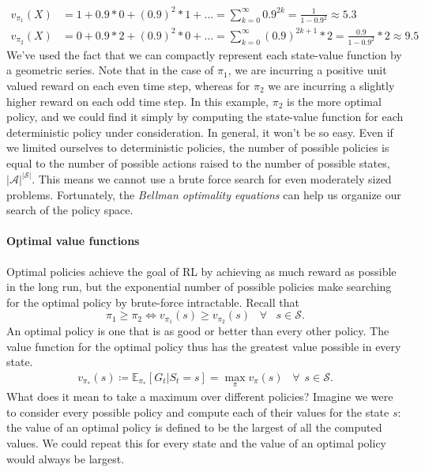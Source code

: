 \documentclass[12pt]{article}
\begin{document}
\begin{align*}
  v_{\pi_1}(X) &= 1 + 0.9 * 0 + (0.9)^2 * 1 + \ldots = \sum_{k=0}^{\infty} 0.9^{2k} = \frac{1}{1-0.9^2} \approx 5.3 \\
  v_{\pi_2}(X) &= 0 + 0.9 * 2 + (0.9)^2 * 0 + \ldots = \sum_{k=0}^{\infty} (0.9)^{2k+1}*2 = \frac{0.9}{1-0.9^2} * 2 \approx 9.5
\end{align*}
We've used the fact that we can compactly represent each state-value function by a geometric series. Note that in the case of $\pi_1$, we are incurring a positive unit valued reward on each even time step, whereas for $\pi_2$ we are incurring a slightly higher reward on each odd time step. In this example, $\pi_2$ is the more optimal policy, and we could find it simply by computing the state-value function for each deterministic policy under consideration. In general, it won't be so easy. Even if we limited ourselves to deterministic policies, the number of possible policies is equal to the number of possible actions raised to the number of possible states, $|\mathcal A|^{|\mathcal S|}$. This means we cannot use a brute force search for even moderately sized problems. Fortunately, the \emph{Bellman optimality equations} can help us organize our search of the policy space.

\paragraph{Optimal value functions}
Optimal policies achieve the goal of RL by achieving as much reward as possible in the long run, but the exponential number of possible policies make searching for the optimal policy by brute-force intractable.
Recall that
\[
  \pi_1 \geq \pi_2 \iff v_{\pi_1}(s) \geq v_{\pi_2}(s) \hspace{10pt} \forall \hspace{10pt} s \in \mathcal S.
\]
An optimal policy is one that is as good or better than every other policy. The value function for the optimal policy thus has the greatest value possible in every state.
\begin{align*}
  v_{\pi_*}(s) \coloneqq \mathbb E_{\pi_*} \left[ G_t | S_t = s \right] = \max_\pi v_\pi (s) \hspace{10pt} \forall \hspace{5pt} s \in \mathcal S.
\end{align*}
What does it mean to take a maximum over different policies? Imagine we were to consider every possible policy and compute each of their values for the state $s$: the value of an optimal policy is defined to be the largest of all the computed values. We could repeat this for every state and the value of an optimal policy would always be largest. 
\end{document}
